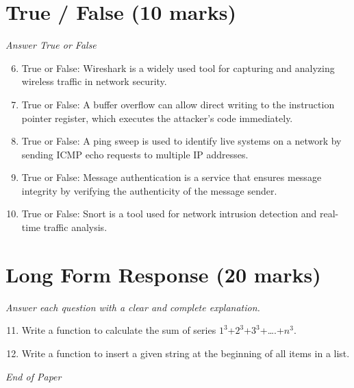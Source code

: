 \documentclass[12pt]{article}
\begin{document}
\section*{True / False (10 marks)}
\textit{Answer True or False}
\begin{enumerate}[label=\arabic*.]
\setcounter{enumi}{5}
\item True or False: Wireshark is a widely used tool for capturing and analyzing wireless traffic in network security.
\item True or False: A buffer overflow can allow direct writing to the instruction pointer register, which executes the attacker's code immediately.
\item True or False: A ping sweep is used to identify live systems on a network by sending ICMP echo requests to multiple IP addresses.
\item True or False: Message authentication is a service that ensures message integrity by verifying the authenticity of the message sender.
\item True or False: Snort is a tool used for network intrusion detection and real-time traffic analysis.
\end{enumerate}

\section*{Long Form Response (20 marks)}
\textit{Answer each question with a clear and complete explanation.}
\begin{enumerate}[label=\arabic*.]
\setcounter{enumi}{10}
\item Write a function to calculate the sum of series $1^3$+$2^3$+$3^3$+….+$n^3$.
\item Write a function to insert a given string at the beginning of all items in a list.
\end{enumerate}

\vfill
\noindent\textit{End of Paper}
\end{document}
